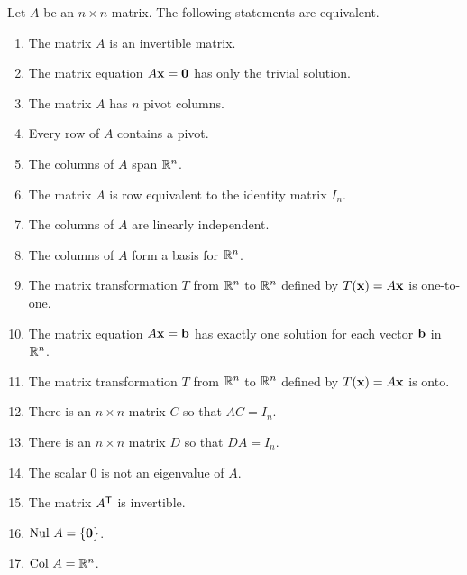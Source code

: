 \begin{theorem} Let $A$ be an $n \times n$ matrix. The following statements are equivalent.
\begin{enumerate}
\item The matrix $A$ is an invertible matrix.
\item \label{item:3_b_trivial_soln} The matrix equation $A \mathbf{x} = \mathbf{0}$ has only the trivial solution.
\item The matrix $A$ has $n$ pivot columns.
\item Every row of $A$ contains a pivot. 
\item The columns of $A$ span $\mathbb{R}^n$.
\item The matrix $A$ is row equivalent to the identity matrix $I_n$.
\item The columns of $A$ are linearly independent.
\item The columns of $A$ form a basis for $\mathbb{R}^n$.
\item The matrix transformation $T$ from $\mathbb{R}^n$ to $\mathbb{R}^n$ defined by $T(\mathbf{x}) = A\mathbf{x}$ is one-to-one.
\item The matrix equation $A \mathbf{x} = \mathbf{b}$ has exactly one solution for each vector $\mathbf{b}$ in $\mathbb{R}^n$.
\item The matrix transformation $T$ from $\mathbb{R}^n$ to $\mathbb{R}^n$ defined by $T(\mathbf{x}) = A\mathbf{x}$ is onto.
\item \label{item:3_b_AC_I} There is an $n \times n$ matrix $C$ so that $AC = I_n$.
\item \label{item:3_b_DA_I} There is an $n \times n$ matrix $D$ so that $DA = I_n$.
\item The scalar 0 is not an eigenvalue of $A$.
\item The matrix $A^{\mathsf{T}}$ is invertible.
\item $\text{Nul } A = \{\mathbf{0}\}$.
\item $\text{Col } A = \mathbb{R}^n$.
\end{enumerate}
\end{theorem}


\label{sec:null_exam}

\ExampleIntro

